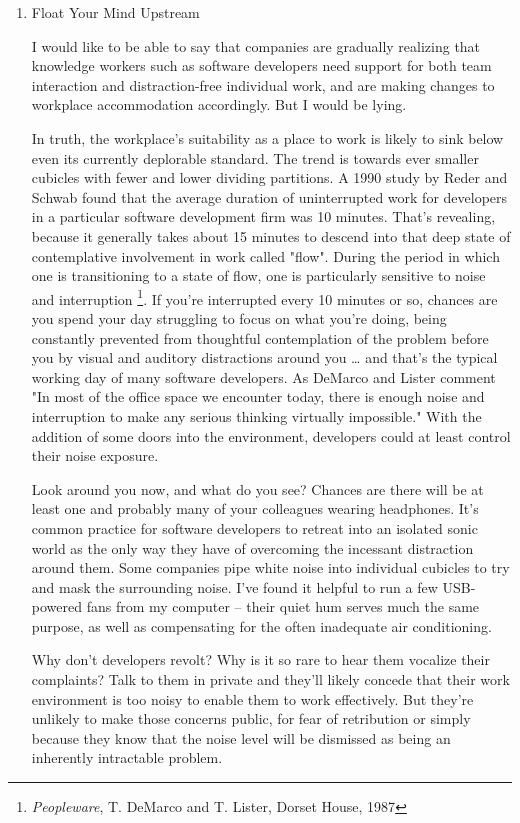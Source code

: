 \documentclass{article}
\begin{document}
\begin{enumerate}
\item Float Your Mind Upstream
\label{sec:orgheadline56}

I would like to be able to say that companies are gradually realizing
that knowledge workers such as software developers need support for both
team interaction and distraction-free individual work, and are making
changes to workplace accommodation accordingly. But I would be lying.

In truth, the workplace's suitability as a place to work is likely to
sink below even its currently deplorable standard. The trend is towards
ever smaller cubicles with fewer and lower dividing partitions. A 1990
study by Reder and Schwab found that the average duration of
uninterrupted work for developers in a particular software development
firm was 10 minutes. That's revealing, because it generally takes about
15 minutes to descend into that deep state of contemplative involvement
in work called "flow". During the period in which one is transitioning
to a state of flow, one is particularly sensitive to noise and
interruption \footnote{\emph{Peopleware}, T. DeMarco and T. Lister, Dorset House, 1987}. If you're interrupted every 10 minutes or so, chances
are you spend your day struggling to focus on what you're doing, being
constantly prevented from thoughtful contemplation of the problem before
you by visual and auditory distractions around you \ldots{} and that's the
typical working day of many software developers. As DeMarco and Lister
comment "In most of the office space we encounter today, there is enough
noise and interruption to make any serious thinking virtually
impossible." With the addition of some doors into the environment,
developers could at least control their noise exposure.

Look around you now, and what do you see? Chances are there will be at
least one and probably many of your colleagues wearing headphones. It's
common practice for software developers to retreat into an isolated
sonic world as the only way they have of overcoming the incessant
distraction around them. Some companies pipe white noise into individual
cubicles to try and mask the surrounding noise. I've found it helpful to
run a few USB-powered fans from my computer -- their quiet hum serves
much the same purpose, as well as compensating for the often inadequate
air conditioning.

Why don't developers revolt? Why is it so rare to hear them vocalize
their complaints? Talk to them in private and they'll likely concede
that their work environment is too noisy to enable them to work
effectively. But they're unlikely to make those concerns public, for
fear of retribution or simply because they know that the noise level
will be dismissed as being an inherently intractable problem.


\end{enumerate}
\end{document}
